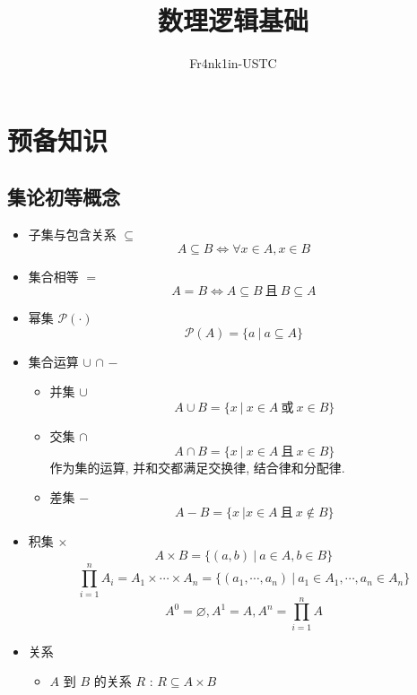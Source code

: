\documentclass[
    color=black,
    device=normal,
    lang=cn
]{elegantnote}
\title{数理逻辑基础}
\author{Fr4nk1in-USTC}
\institute{中国科学技术大学计算机学院}
\date{}
\begin{document}
\setlength\abovedisplayskip{.125em}
\setlength\belowdisplayskip{.125em}
\maketitle
\tableofcontents
\newpage
\setcounter{section}{-1}
\section{预备知识}
\subsection{集论初等概念}
\begin{itemize}
    \item 子集与包含关系 $\subseteq$
          $$
              A\subseteq B \Leftrightarrow \forall x\in A, x\in B
          $$
    \item 集合相等 $=$
          $$
              A=B \Leftrightarrow A\subseteq B\ \text{且}\ B\subseteq A
          $$
    \item 幂集 $\mathcal{P(\cdot)}$
          $$
              \mathcal{P}(A) = \{a\ \vert\ a\subseteq A\}
          $$
    \item 集合运算 $\cup$ $\cap$ $-$
          \begin{itemize}
              \item 并集 $\cup$
                    $$
                        A\cup B = \{x\ \vert\ x\in A\ \text{或}\ x \in B\}
                    $$
              \item 交集 $\cap$
                    $$
                        A\cap B = \{x\ \vert\ x\in A\ \text{且}\ x \in B\}
                    $$
                    作为集的运算, 并和交都满足交换律, 结合律和分配律.
              \item 差集 $-$
                    $$
                        A-B=\{x\ \vert x\in A\ \text{且}\ x \notin B\}
                    $$
          \end{itemize}
    \item 积集 $\times$
          $$
              A\times B = \{(a,b)\ \vert\ a\in A,b \in B\}
          $$
          $$
              \prod_{i=1}^n A_i = A_1\times \cdots \times A_n = \{(a_1, \cdots, a_n)\ \vert\ a_1\in A_1,\cdots, a_n\in A_n\}
          $$
          $$
              A^0 = \varnothing  , A^1 = A, A^n = \prod_{i = 1}^n A
          $$
    \item 关系
          \begin{itemize}
              \item $A$ 到 $B$ 的关系 $R$ : $R\subseteq A\times B$

\end{itemize}
\end{itemize}
\end{document}
